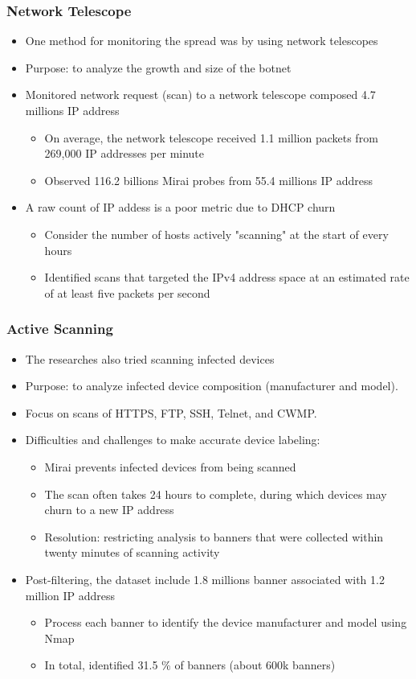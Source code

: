 \documentclass{beamer}
\begin{document}
\begin{frame}
	\frametitle{Network Telescope}
	\begin{itemize}
		\item One method for monitoring the spread was by using network telescopes
		\item Purpose: to analyze the growth and size of the botnet
		\item Monitored network request (scan) to a network telescope composed 4.7 millions IP address
		\begin{itemize}
			\item On average, the network telescope received 1.1 million packets from 269,000 IP addresses per minute 
			\item Observed 116.2 billions Mirai probes from 55.4 millions IP address
		\end{itemize}
		\item A raw count of IP addess is a poor metric due to DHCP churn
		\begin{itemize}
			\item Consider the number of hosts actively "scanning" at the start of every hours
			\item Identified scans that targeted the IPv4 address space at an estimated rate of at least five packets per second
		\end{itemize}
	\end{itemize}
\end{frame}

\begin{frame}
	\frametitle{Active Scanning}
	\begin{itemize}
		\item The researches also tried scanning infected devices
		\item Purpose: to analyze infected device composition (manufacturer and model).
		\item Focus on scans of HTTPS, FTP, SSH, Telnet, and CWMP.
		\item Difficulties and challenges to make accurate device labeling:		
		\begin{itemize}
			\item Mirai prevents infected devices from being scanned
			\item The scan often takes 24 hours to complete, during which devices may churn to a new IP address
			\item Resolution: restricting analysis to banners that were collected within twenty minutes of scanning activity
		\end{itemize}
		\item Post-filtering, the dataset include 1.8 millions banner associated with 1.2 million IP address
		\begin{itemize}
			\item Process each banner to identify the device manufacturer and model using Nmap
			\item In total, identified 31.5 \% of banners (about 600k banners)
		\end{itemize}
	\end{itemize}
\end{frame}
\end{document}
